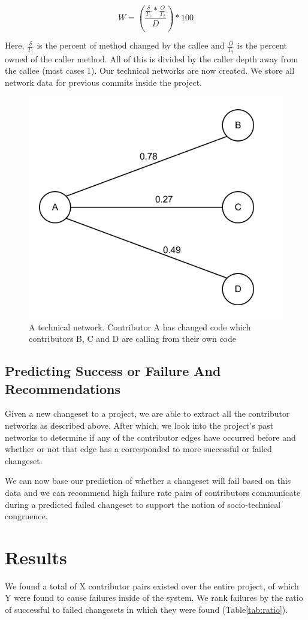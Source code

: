 \documentclass[conference]{IEEEtran}
\begin{document}
\begin{equation}\label{first}
W = (\frac{\frac{\delta}{T_{1}}*\frac{O}{T_{2}}}{D})*100
\end{equation}

Here, $\frac{\delta}{T_{1}}$ is the percent of method changed by the callee and $\frac{O}{T_{2}}$ 
is the percent owned of the caller method. All of this is divided by the caller depth away from 
the callee (most cases 1).  Our technical networks are now created. We store all network data for
previous commits inside the project.

\begin{figure}[tb!]
\centering
\includegraphics[width=0.5\columnwidth]{images/network}
\caption{A technical network. Contributor A has changed code which contributors B, C and D 
are calling from their own code}
\end{figure}

\subsection{Predicting Success or Failure And Recommendations}
Given a new changeset to a project, we are able to extract all the contributor networks as described
above. After which, we look into the project's past networks to determine if any of the contributor edges have
occurred before and whether or not that edge has a  corresponded to more successful or failed changeset. 

We can now base our prediction of whether a changeset will fail based on this data and we can recommend
high failure rate pairs of contributors communicate during a predicted failed changeset to support the notion
of socio-technical congruence.

\section{Results}
We found a total of X contributor pairs existed over the entire project, of which Y were found to cause
failures inside of the system. We rank failures by the ratio of successful to failed changesets in which 
they were found (Table\ref{tab:ratio}).
\end{document}
